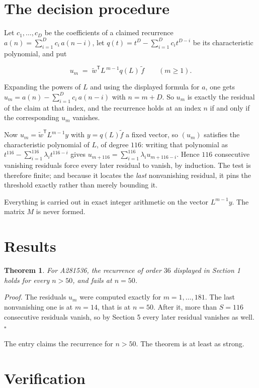 \documentclass[11pt]{article}
\newtheorem{theorem}{Theorem}
\theoremstyle{definition}
\begin{document}
\section{The decision procedure}

Let $c_1,\dots,c_D$ be the coefficients of a claimed recurrence $a(n) = \sum_{i=1}^{D} c_i\,a(n-i)$, let $q(t) = t^{D} - \sum_{i=1}^{D} c_i t^{D-i}$ be its characteristic polynomial, and put

\[u_m \;=\; \tilde w^{\mathsf T} L^{\,m-1} q(L)\,\tilde f \qquad (m \ge 1).\]

Expanding the powers of $L$ and using the displayed formula for $a$, one gets $u_m = a(n) - \sum_{i=1}^{D} c_i\,a(n-i)$ with $n = m + D$. So $u_m$ is exactly the residual of the claim at that index, and the recurrence holds at an index $n$ if and only if the corresponding $u_m$ vanishes.

Now $u_m = \tilde w^{\mathsf T} L^{m-1} y$ with $y = q(L)\tilde f$ a fixed vector, so $(u_m)$ satisfies the characteristic polynomial of $L$, of degree $116$: writing that polynomial as $t^{116} - \sum_{i=1}^{116} \lambda_i t^{116-i}$ gives $u_{m+116} = \sum_{i=1}^{116} \lambda_i u_{m+116-i}$. Hence $116$ consecutive vanishing residuals force every later residual to vanish, by induction. The test is therefore finite; and because it locates the {\itshape last} nonvanishing residual, it pins the threshold exactly rather than merely bounding it.

Everything is carried out in exact integer arithmetic on the vector $L^{m-1}y$. The matrix $M$ is never formed.

\section{Results}

\begin{theorem} For A281536, the recurrence of order $36$ displayed in Section 1 holds for every $n > 50$, and fails at $n = 50$.\end{theorem}

{\itshape Proof.} The residuals $u_m$ were computed exactly for $m = 1,\dots,181$. The last nonvanishing one is at $m = 14$, that is at $n = 50$. After it, more than $S = 116$ consecutive residuals vanish, so by Section 5 every later residual vanishes as well. $\square$

The entry claims the recurrence for $n > 50$. The theorem is at least as strong.

\section{Verification}
\end{document}
